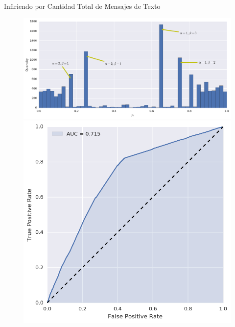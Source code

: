 \documentclass[usenames,dvipsnames,table]{beamer}
\begin{document}
\begin{frame}{Infiriendo por Cantidad Total de Mensajes de Texto}

	\begin{figure}
		\includegraphics[width=\framewidth, height=.37\textheight, keepaspectratio]{bayes/hist_sms.png} \\
		\includegraphics[width=.49\framewidth, height=.37\textheight, keepaspectratio]{bayes/roc_sms.png}

\end{figure}
\end{frame}
\end{document}
